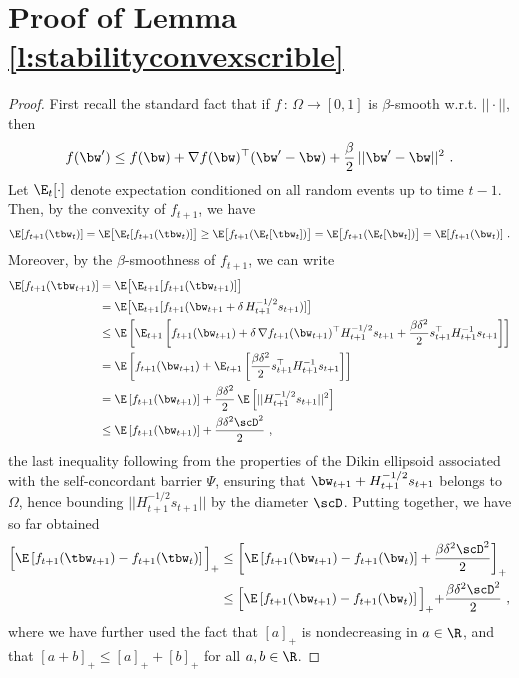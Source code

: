 \section{Proof of Lemma \ref{l:stabilityconvexscrible}}

\begin{proof}
First recall the standard fact that if $f\,:\,\Omega \rightarrow [0,1]$ is $\beta$-smooth w.r.t. $||\cdot||$, then
\[
f(\bw') \leq f(\bw) + \nabla f(\bw)^\top(\bw'-\bw) + \frac{\beta}{2}\,||\bw'-\bw||^2~.
\]
Let $\E_t[\cdot]$ denote expectation conditioned on all random events up to time $t-1$. Then, by the convexity of $f_{t+1}$, we have
%
\begin{align*}
\E[f_{t+1}(\tbw_{t})] 
= \E\big[\E_{t}[f_{t+1}(\tbw_{t})]\big]
\geq \E\big[f_{t+1}(\E_{t}[\tbw_{t}])\big]
= \E\big[f_{t+1}(\E_{t}[\bw_{t}])\big]
= \E[f_{t+1}(\bw_{t})]~.
\end{align*}
%
Moreover, by the $\beta$-smoothness of $f_{t+1}$, we can write
%
\begin{align*}
\E[f_{t+1}(\tbw_{t+1})] 
&= \E\big[\E_{t+1}[f_{t+1}(\tbw_{t+1})]\big]\\
&= \E\big[\E_{t+1}[f_{t+1}(\bw_{t+1} + \delta\,H_{t+1}^{-1/2}s_{t+1})]\big]\\
&\leq \E\left[\E_{t+1}\left[f_{t+1}(\bw_{t+1}) + \delta\,\nabla f_{t+1}(\bw_{t+1})^\top H_{t+1}^{-1/2}s_{t+1}  + \frac{\beta\delta^2}{2}s_{t+1}^\top H_{t+1}^{-1}s_{t+1}\right]\right]\\
&= \E\left[f_{t+1}(\bw_{t+1}) + \E_{t+1}\left[\frac{\beta\delta^2}{2}s_{t+1}^\top H_{t+1}^{-1}s_{t+1}\right]\right]\\
&= \E\left[f_{t+1}(\bw_{t+1})\right] + \frac{\beta\delta^2}{2}\,\E\left[||H_{t+1}^{-1/2}s_{t+1}||^2\right]\\
&\leq \E\left[f_{t+1}(\bw_{t+1})\right] + \frac{\beta\delta^2\scD^2}{2}~,
\end{align*}
%
the last inequality following from the properties of the Dikin ellipsoid associated with the self-concordant barrier $\Psi$, ensuring that $\bw_{t+1} + H_{t+1}^{-1/2}s_{t+1}$ belongs to $\Omega$, hence bounding $||H_{t+1}^{-1/2}s_{t+1}||$ by the diameter $\scD$.
%
Putting together, we have so far obtained
%
\begin{align}\label{e:1}
\Bigl[\E\left[f_{t+1}(\tbw_{t+1}) - f_{t+1}(\tbw_{t})\right]\Bigl]_+ 
&\leq 
\left[\E\left[f_{t+1}(\bw_{t+1}) - f_{t+1}(\bw_{t})\right]  + \frac{\beta\delta^2\scD^2}{2}\right]_+ \notag\\
&\leq 
\Bigl[\E\left[f_{t+1}(\bw_{t+1}) - f_{t+1}(\bw_{t})\right]\Bigl]_+ + \frac{\beta\delta^2\scD^2}{2}~,
\end{align}
%
where we have further used the fact that $[a]_+$ is nondecreasing in $a \in \R$, and that $[a+b]_+ \leq [a]_+ + [b]_+$ for all $a,b \in \R$.


\end{proof}
